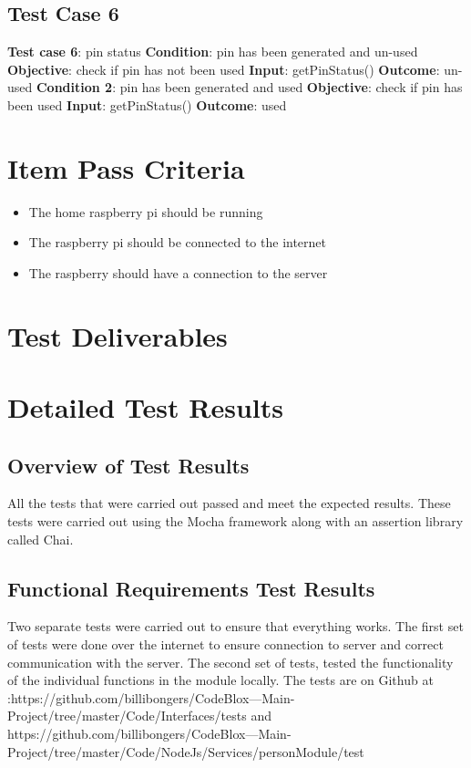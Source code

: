 \documentclass[a4paper,12pt]{article}
\begin{document}
		\subsection{Test Case 6}
		\textbf{Test case 6}: pin status \newline
		\textbf{Condition}: pin has been generated and un-used \newline
		\textbf{Objective}: check if pin has not been used \newline
		\textbf{Input}: getPinStatus() \newline
		\textbf{Outcome}: un-used \newline \newline
		\textbf{Condition 2}: pin has been generated and used\newline
		\textbf{Objective}: check if pin has been used\newline
		\textbf{Input}: getPinStatus()\newline
		\textbf{Outcome}: used\newline
		
	\section{Item Pass Criteria}
		\begin{itemize}
			\item The home raspberry pi should be running
			\item The raspberry pi should be connected to the internet
			\item The raspberry should have a connection to the server
		\end{itemize}
		
	\section{Test Deliverables}
	
	\section{Detailed Test Results}
		\subsection{Overview of Test Results}
		All the tests that were carried out passed and meet the expected results. These tests were carried out using the Mocha framework along with an assertion library called Chai.
		
		\subsection{Functional Requirements Test Results}
		Two separate tests were carried out to ensure that everything works. The first set of tests were done over the internet to ensure connection to server and correct communication with the server. The second set of tests, tested the functionality of the individual functions in the module locally. The tests are on Github at :https://github.com/billibongers/CodeBlox---Main-Project/tree/master/Code/Interfaces/tests and https://github.com/billibongers/CodeBlox---Main-Project/tree/master/Code/NodeJs/Services/personModule/test 
		
\end{document}
